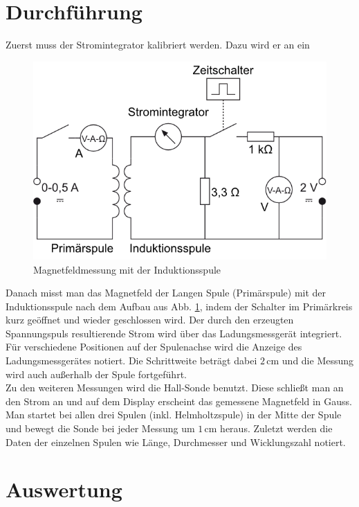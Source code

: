\documentclass[12pt,a4paper,titlepage,headinclude,bibtotoc]{scrartcl}
\begin{document}
\section{Durchführung}
\label{sec:durchfuehrung}
Zuerst muss der Stromintegrator kalibriert werden.
Dazu wird er an ein \\
\begin{figure}[!htb]
	 \centering
	 \includegraphics[scale=1.0]{IndSpuleAufbau.png}
	\caption{Magnetfeldmessung mit der Induktionsspule \cite[Datum: 09.10.2014]{LP13}}	 
	 \label{fig:IndSpule}
\end{figure}
Danach misst man das Magnetfeld der Langen Spule (Primärspule) mit der Induktionsspule nach dem Aufbau aus Abb. \ref{fig:IndSpule}, indem der Schalter im Primärkreis kurz geöffnet und wieder geschlossen wird.
Der durch den erzeugten Spannungspuls resultierende Strom wird über das Ladungsmessgerät integriert.
Für verschiedene Positionen auf der Spulenachse wird die Anzeige des Ladungsmessgerätes notiert.
Die Schrittweite beträgt dabei $2\,$cm und die Messung wird auch außerhalb der Spule fortgeführt.\\
Zu den weiteren Messungen wird die Hall-Sonde benutzt.
Diese schließt man an den Strom an und auf dem Display erscheint das gemessene Magnetfeld in Gauss.
Man startet bei allen drei Spulen (inkl. Helmholtzspule) in der Mitte der Spule und bewegt die Sonde bei jeder Messung um $1\,$cm heraus.
Zuletzt werden die Daten der einzelnen Spulen wie Länge, Durchmesser und Wicklungszahl notiert.


\section{Auswertung}
\label{sec:auswertung}
\end{document}
